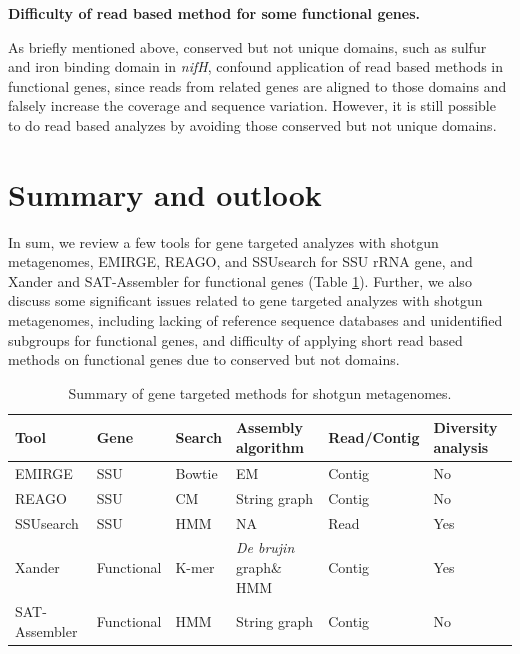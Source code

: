 \documentclass[]{msu-thesis}
\begin{document}
\textbf{Difficulty of read based method for some functional genes.}

As briefly mentioned above, conserved but not unique domains, such as sulfur and iron binding domain in \textit{nifH}, confound application of read based methods in functional genes, since reads from related genes are aligned to those domains and falsely increase the coverage and sequence variation. However, it is still possible to do read based analyzes by avoiding those conserved but not unique domains. 

\section{Summary and outlook}

In sum, we review a few tools for gene targeted analyzes with shotgun metagenomes, EMIRGE, REAGO, and SSUsearch for SSU rRNA gene, and Xander and SAT-Assembler for functional genes (Table \ref{tab:toolSumm}). Further, we also discuss some significant issues related to gene targeted analyzes with shotgun metagenomes, including lacking of reference sequence databases and unidentified subgroups for functional genes, and difficulty of applying short read based methods on functional genes due to conserved but not domains. 

\begin{table}[htbp]
  \centering
  \caption[Summary of gene targeted methods for shotgun metagenomes]{Summary of gene targeted methods for shotgun metagenomes.}
    \begin{tabular}{|llllll|}
    \toprule
    Tool  & Gene & Search & Assembly algorithm & Read/Contig & Diversity analysis \\
    \midrule
    EMIRGE & SSU & Bowtie & EM    & Contig & No \\
    REAGO & SSU & CM    & String graph & Contig & No \\
    SSUsearch & SSU & HMM   & NA    & Read  & Yes \\
    Xander & Functional & K-mer & \textit{De brujin} graph\& HMM & Contig & Yes \\
    SAT-Assembler & Functional & HMM   & String graph & Contig & No \\
    \bottomrule
    \end{tabular}%
  \label{tab:toolSumm}%
\end{table}%
\end{document}
